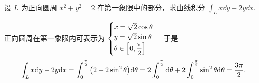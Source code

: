 \begin{example}[2004 数一]
    设 $L$ 为正向圆周 $x^2+y^2=2$ 在第一象限中的部分，求曲线积分 $\displaystyle\int_Lx\dd y-2y\dd x.$
\end{example}
\begin{solution}
    正向圆周在第一象限内可表示为 $\begin{cases}
            x=\sqrt{2}\cos\theta \\y=\sqrt{2}\sin\theta\\\theta\in\qty[0,\dfrac{\pi}{2}]
        \end{cases}$
    于是 $$\int_Lx\dd y-2y\dd x=\int_{0}^{\frac{\pi}{2}}\qty(2+2\sin^2\theta)\dd \theta=2\int_{0}^{\frac{\pi}{2}}\dd \theta+2\int_{0}^{\frac{\pi}{2}}\sin^2\theta\dd \theta=\dfrac{3\pi}{2}.$$
\end{solution}

